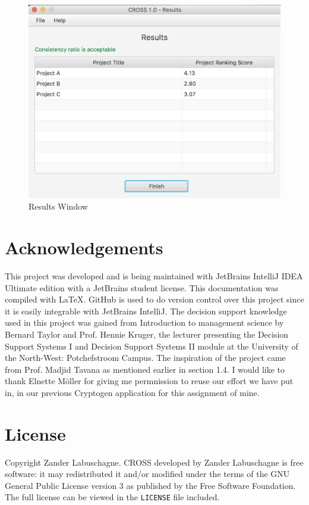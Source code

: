 \documentclass[11pt]{article}
\newcommand{\code}[1]{\texttt{#1}}
\begin{document}
		\begin{figure}[!htb]
			\centering
			\includegraphics[scale=0.55]{results}
			\caption{Results Window} %
			\label{fig:results} %
		\end{figure}

	\newpage


	\section{Acknowledgements}
		This project was developed and is being maintained with JetBrains IntelliJ IDEA Ultimate edition with a JetBrains student license. This documentation was compiled with \LaTeX. GitHub is used to do version control over this project since it is easily integrable with JetBrains IntelliJ. The decision support knowledge used in this project was gained from Introduction to management science by Bernard Taylor \cite{taylor2004introduction} and Prof. Hennie Kruger, the lecturer presenting the Decision Support Systems I and Decision Support Systems II module at the University of the North-West: Potchefstroom Campus. The inspiration of the project came from Prof. Madjid Tavana as mentioned earlier in section 1.4. I would like to thank Elnette M\"oller for giving me permnission to reuse our effort we have put in, in our previous Cryptogen application for this assignment of mine.
		
	\newpage

	\section{License}
		Copyright \textcopyright {} Zander Labuschagne. CROSS developed by Zander Labuschagne is free software: it may redistributed it and/or modified under the terms of the GNU General Public License version 3 as published by the Free Software Foundation. The full license can be viewed in the \code{LICENSE} file included.
\end{document}
